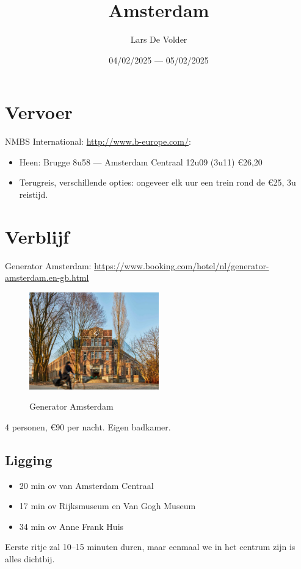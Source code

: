 \documentclass[a4paper, 12pt]{article}
\title{Amsterdam}
\author{Lars De Volder}
\date{04/02/2025 --- 05/02/2025}
\begin{document}
\maketitle

\section{Vervoer}

NMBS International: \url{http://www.b-europe.com/}:
\begin{itemize}
    \item Heen: Brugge 8u58 --- Amsterdam Centraal 12u09 (3u11) €26,20
    \item Terugreis, verschillende opties: ongeveer elk uur een trein rond de €25, 3u reistijd.
\end{itemize}

\section{Verblijf}

Generator Amsterdam: \url{https://www.booking.com/hotel/nl/generator-amsterdam.en-gb.html}\\
\begin{figure}[h]
    \centering
    \includegraphics[width=0.5\textwidth]{generator_amsterdam.jpg}\label{fig:generator_amsterdam}
    \caption{Generator Amsterdam}
\end{figure}
4 personen, €90 per nacht. Eigen badkamer.

\subsection{Ligging}
\begin{itemize}
    \item 20 min ov van Amsterdam Centraal
    \item 17 min ov Rijksmuseum en Van Gogh Museum
    \item 34 min ov Anne Frank Huis
\end{itemize}
Eerste ritje zal 10--15 minuten duren, maar eenmaal we in het centrum zijn is alles dichtbij.
\end{document}
